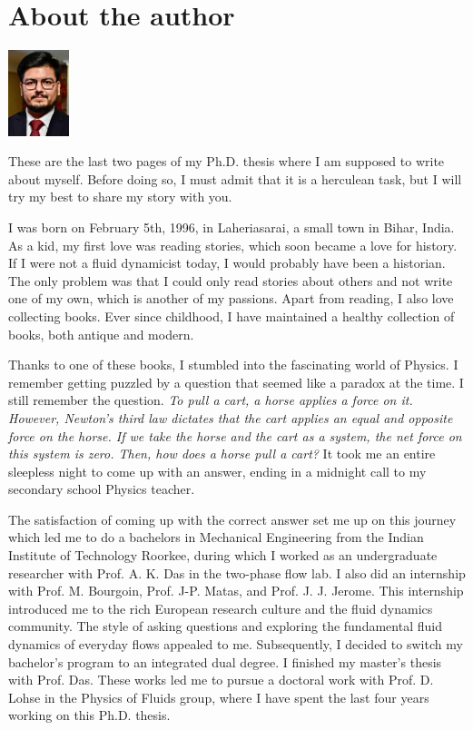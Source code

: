 \chapter{About the author}
\phantom{me}\hfill \includegraphics[height=25mm]{FiguresMisc/Vatsal.pdf}\\ %
\vspace{5mm}

These are the last two pages of my Ph.D. thesis where I am supposed to write about myself. Before doing so, I must admit that it is a herculean task, but I will try my best to share my story with you.

I was born on February 5th, 1996, in Laheriasarai, a small town in Bihar, India. As a kid, my first love was reading stories, which soon became a love for history. If I were not a fluid dynamicist today, I would probably have been a historian. The only problem was that I could only read stories about others and not write one of my own, which is another of my passions. Apart from reading, I also love collecting books. Ever since childhood, I have maintained a healthy collection of books, both antique and modern. 

Thanks to one of these books, I stumbled into the fascinating world of Physics. I remember getting puzzled by a question that seemed like a paradox at the time. I still remember the question. {\it To pull a cart, a horse applies a force on it. However, Newton's third law dictates that the cart applies an equal and opposite force on the horse. If we take the horse and the cart as a system, the net force on this system is zero. Then, how does a horse pull a cart?} It took me an entire sleepless night to come up with an answer, ending in a midnight call to my secondary school Physics teacher. 

The satisfaction of coming up with the correct answer set me up on this journey which led me to do a bachelors in Mechanical Engineering from the Indian Institute of Technology Roorkee, during which I worked as an undergraduate researcher with Prof. A. K. Das in the two-phase flow lab. I also did an internship with Prof. M. Bourgoin, Prof. J-P. Matas, and Prof. J. J. Jerome. This internship introduced me to the rich European research culture and the fluid dynamics community. The style of asking questions and exploring the fundamental fluid dynamics of everyday flows appealed to me. Subsequently, I decided to switch my bachelor's program to an integrated dual degree. I finished my master's thesis with Prof. Das. These works led me to pursue a doctoral work with Prof. D. Lohse in the Physics of Fluids group, where I have spent the last four years working on this Ph.D. thesis. 

